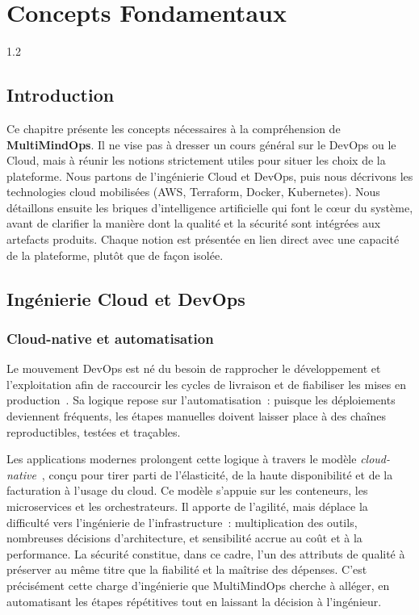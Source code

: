 \chapter{Concepts Fondamentaux}
\begin{spacing}{1.2}
\minitoc
\thispagestyle{MyStyle}
\end{spacing}
\clearpage

\section{Introduction}

Ce chapitre présente les concepts nécessaires à la compréhension de \textbf{MultiMindOps}.
Il ne vise pas à dresser un cours général sur le DevOps ou le Cloud, mais à réunir les
notions strictement utiles pour situer les choix de la plateforme. Nous partons de
l'ingénierie Cloud et DevOps, puis nous décrivons les technologies cloud mobilisées (AWS,
Terraform, Docker, Kubernetes). Nous détaillons ensuite les briques d'intelligence
artificielle qui font le c\oe ur du système, avant de clarifier la manière dont la qualité
et la sécurité sont intégrées aux artefacts produits. Chaque notion est présentée en lien
direct avec une capacité de la plateforme, plutôt que de façon isolée.

\section{Ingénierie Cloud et DevOps}

\subsection{Cloud-native et automatisation}

Le mouvement DevOps est né du besoin de rapprocher le développement et l'exploitation afin
de raccourcir les cycles de livraison et de fiabiliser les mises en production~\cite{DEVOPS_HANDBOOK}.
Sa logique repose sur l'automatisation~: puisque les déploiements deviennent fréquents, les
étapes manuelles doivent laisser place à des chaînes reproductibles, testées et traçables.

Les applications modernes prolongent cette logique à travers le modèle
\textit{cloud-native}~\cite{CNCF}, conçu pour tirer parti de l'élasticité, de la haute
disponibilité et de la facturation à l'usage du cloud. Ce modèle s'appuie sur les
conteneurs, les microservices et les orchestrateurs. Il apporte de l'agilité, mais déplace
la difficulté vers l'ingénierie de l'infrastructure~: multiplication des outils, nombreuses
décisions d'architecture, et sensibilité accrue au coût et à la performance. La sécurité
constitue, dans ce cadre, l'un des attributs de qualité à préserver au même titre que la
fiabilité et la maîtrise des dépenses. C'est précisément cette charge d'ingénierie que
MultiMindOps cherche à alléger, en automatisant les étapes répétitives tout en laissant la
décision à l'ingénieur.

